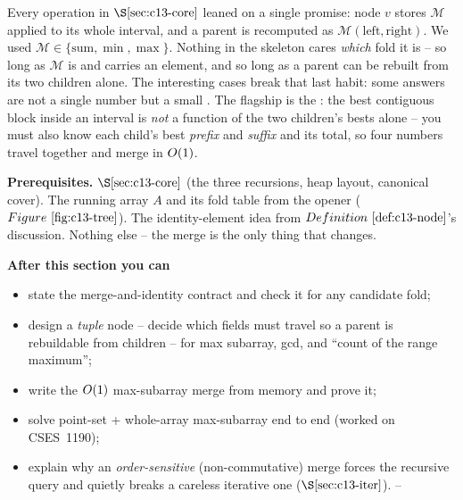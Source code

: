 \begin{topicintro}
Every operation in \(\secref{c13-core}\) leaned on a single promise: node
\(v\) stores \(\mathcal{M}\) applied to its whole interval, and a parent is
recomputed as \(\mathcal{M}(\text{left},\text{right})\).  We used
\(\mathcal{M}\in\{\text{sum},\min,\max\}\).  Nothing in the skeleton cares
\emph{which} fold it is -- so long as \(\mathcal{M}\) is  and
carries an  element, and so long as a parent can be rebuilt from
its two children alone.  The interesting cases break that last habit: some
answers are not a single number but a small .  The flagship is the
: the best contiguous block inside an interval is
\emph{not} a function of the two children's bests alone -- you must also know
each child's best \emph{prefix} and \emph{suffix} and its total, so four numbers
travel together and merge in \(O(1)\).

\textbf{Prerequisites.} \(\secref{c13-core}\) (the three recursions, heap
layout, canonical cover).  The running array \(A\) and its fold table from the
opener (\(\figref{c13-tree}\)).  The identity-element idea from
\(\defref{c13-node}\)'s discussion.  Nothing else -- the merge is the only thing
that changes.

\textbf{After this section you can}
\begin{itemize}[nosep]
  \item state the merge-and-identity contract and check it for any candidate
        fold; \hfill{}
  \item design a \emph{tuple} node -- decide which fields must travel so a
        parent is rebuildable from children -- for max subarray, gcd, and
        ``count of the range maximum''; \hfill{}
  \item write the \(O(1)\) max-subarray merge from memory and prove it; \hfill{}
  \item solve point-set + whole-array max-subarray end to end (worked on
        CSES~1190); \hfill{}
  \item explain why an \emph{order-sensitive} (non-commutative) merge forces the
        recursive query and quietly breaks a careless iterative one
        (\(\secref{c13-iter}\)). \hfill{}--
\end{itemize}
\end{topicintro}

